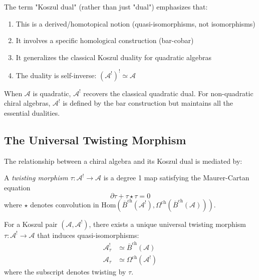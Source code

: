 \begin{remark}
The term "Koszul dual" (rather than just "dual") emphasizes that:
\begin{enumerate}
\item This is a derived/homotopical notion (quasi-isomorphisms, not isomorphisms)
\item It involves a specific homological construction (bar-cobar)
\item It generalizes the classical Koszul duality for quadratic algebras
\item The duality is self-inverse: $(\mathcal{A}^!)^! \simeq \mathcal{A}$
\end{enumerate}

When $\mathcal{A}$ is quadratic, $\mathcal{A}^!$ recovers the classical quadratic dual. For non-quadratic chiral algebras, $\mathcal{A}^!$ is defined by the bar construction but maintains all the essential dualities.
\end{remark}

\subsection{The Universal Twisting Morphism}

The relationship between a chiral algebra and its Koszul dual is mediated by:

\begin{definition}
A \emph{twisting morphism} $\tau: \mathcal{A}^! \to \mathcal{A}$ is a degree 1 map satisfying the Maurer-Cartan equation
\[
\partial \tau + \tau \star \tau = 0
\]
where $\star$ denotes convolution in $\text{Hom}(\overline{B}^{\text{ch}}(\mathcal{A}^!), \Omega^{\text{ch}}(\overline{B}^{\text{ch}}(\mathcal{A})))$.
\end{definition}

\begin{theorem}
For a Koszul pair $(\mathcal{A}, \mathcal{A}^!)$, there exists a unique universal twisting morphism $\tau: \mathcal{A}^! \to \mathcal{A}$ that induces quasi-isomorphisms:
\begin{align}
\mathcal{A}^!_{\tau} &\simeq \overline{B}^{\text{ch}}(\mathcal{A}) \\
\mathcal{A}_{\tau} &\simeq \Omega^{\text{ch}}(\mathcal{A}^!)
\end{align}
where the subscript denotes twisting by $\tau$.
\end{theorem}

